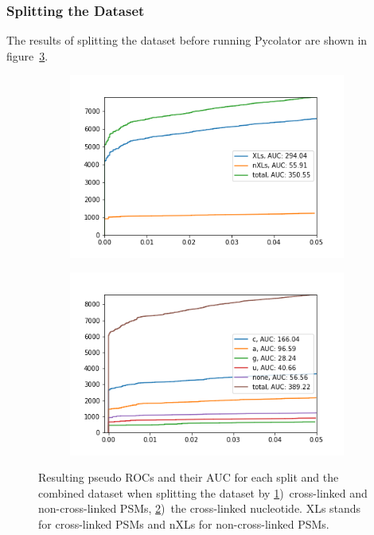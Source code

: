 \subsubsection{Splitting the Dataset}
\label{lab:results:splitting}
The results of splitting the dataset before running Pycolator are shown in figure~\ref{fig:results:splitting}.
\renewcommand{\baselinestretch}{0.9}
\begin{figure}
	\normalsize
	\centering
	\begin{subfigure}{0.49 \textwidth}
		\includegraphics[width = \textwidth]{figures/split_by_xl.png}
		\caption{}
		\label{fig:results:splitting_xl}
	\end{subfigure}
	\hfill
	\begin{subfigure}{0.49 \textwidth}
		\includegraphics[width = \textwidth]{figures/split_by_bases.png}
		\caption{}
		\label{fig:results:splitting_bases}
	\end{subfigure}
	\caption[Results of splitting the dataset]{Resulting pseudo ROCs and their AUC for each split and the combined dataset when splitting the dataset by \ref{fig:results:splitting_xl})~cross-linked and non-cross-linked PSMs, \ref{fig:results:splitting_bases})~the cross-linked nucleotide. XLs stands for cross-linked PSMs and nXLs for non-cross-linked PSMs.}
	\label{fig:results:splitting}
\end{figure}
\renewcommand{\baselinestretch}{1}

